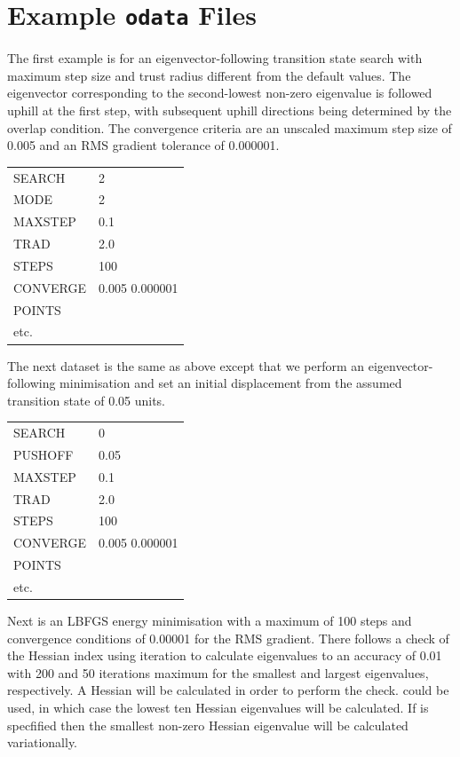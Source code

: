 {{{\section{Example {\tt odata} Files}
\label{sec:examples}
The first example is for an eigenvector-following 
transition state search with maximum step size and  trust radius different from the default
values. The eigenvector corresponding to the second-lowest non-zero eigenvalue is followed
uphill at the first step, with subsequent uphill directions being determined by the overlap
condition. The convergence criteria are an unscaled maximum step size of 0.005 and an RMS
gradient tolerance of 0.000001. 

\medskip
\begin{tabular}{ll}
 SEARCH & 2  \\
 MODE & 2 \\
 MAXSTEP & 0.1  \\
 TRAD & 2.0  \\
 STEPS & 100  \\
 CONVERGE & 0.005 0.000001  \\
 POINTS  \\
 etc.  \\
\end{tabular}
\medskip

\noindent The next dataset is the same as above except that we perform an eigenvector-following
minimisation and set an initial displacement from the assumed transition state of
0.05 units.

\medskip
\begin{tabular}{ll}
 SEARCH & 0 \\
 PUSHOFF & 0.05 \\
 MAXSTEP & 0.1 \\
 TRAD & 2.0 \\
 STEPS & 100 \\
 CONVERGE & 0.005 0.000001 \\
 POINTS \\
 etc. \\
\end{tabular}
\medskip

\noindent Next is an LBFGS energy minimisation with a maximum of 100 steps and
convergence conditions of 0.00001 for the RMS gradient.
There follows a check of the Hessian index using iteration to calculate 
eigenvalues to an accuracy of 0.01 with 200 and 50 iterations maximum for the smallest
and largest eigenvalues, respectively. A Hessian will be calculated in order to 
perform the check. {} could be used, in which case the lowest ten Hessian
eigenvalues will be calculated. If {} is specfified then the smallest
non-zero Hessian eigenvalue will be calculated variationally.

}}}
